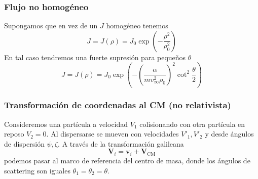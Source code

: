 \documentclass[]{article}
\numberwithin{equation}{section}
\begin{document}
\subsubsection{Flujo no homogéneo}
Supongamos que en vez de un \(J\) homogéneo tenemos
\begin{equation*}
	J = J(\rho) = J_0 \exp\left(- \frac{\rho^2}{\rho_0^2}\right)
\end{equation*}
En tal caso tendremos una fuerte supresión para pequeños \(\theta\)
\begin{equation}
	J = J(\rho) = J_0 \exp\left(- \left(\frac{\alpha}{m v_\infty^2 \rho_0}\right)^2 \cot^2\frac{\theta}{2}\right)
\end{equation}

\subsubsection{Transformación de coordenadas al CM (no relativista)}
Consideremos una partícula a velocidad \(V_1\) colisionando con otra partícula en reposo \(V_2 = 0\). Al dispersarse se mueven con velocidades \(V'_1, V'_2\) y desde ángulos de dispersión \(\psi, \zeta\). A través de la transformación galileana 
\begin{equation*}
	\mathbf{V}_i = \mathbf{v}_i + \mathbf{V}_{\mathrm{CM}}
\end{equation*}
podemos pasar al marco de referencia del centro de masa, donde los ángulos de scattering son iguales \(\theta_1 = \theta_2 = \theta\).
\end{document}
